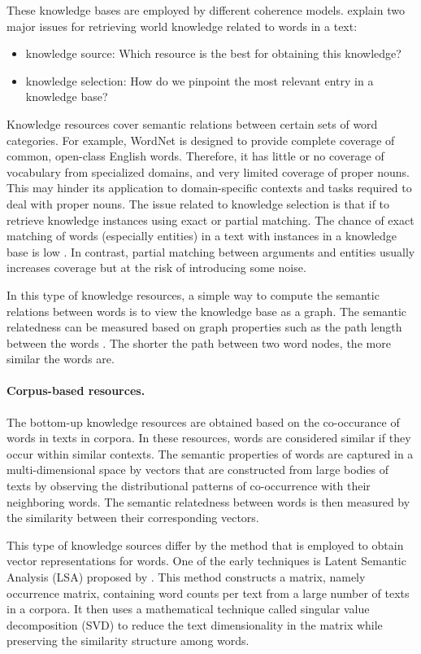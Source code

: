 These knowledge bases are employed by different coherence models.  
 explain two major issues for retrieving world knowledge related to words in a text: 
\begin{itemize}
\item knowledge source: Which resource is the best for obtaining this knowledge? 
\item knowledge selection: How do we pinpoint the most relevant entry in a knowledge base?
\end{itemize}
Knowledge resources cover semantic relations between certain sets of word categories.  
For example, WordNet is designed to provide complete coverage of common, open-class English words. 
Therefore, it has little or no coverage of vocabulary from specialized domains, and very limited coverage of proper nouns. 
This may hinder its application to domain-specific contexts and tasks required to deal with proper nouns. 
The issue related to knowledge selection is that if to retrieve knowledge instances using exact or partial matching. 
The chance of exact matching of words (especially entities) in a text with instances in a knowledge base is low \cite{zhangmuyu15}. 
In contrast, partial matching between arguments and entities usually increases coverage but at the risk of introducing some noise. 

In this type of knowledge resources, a simple way to compute the semantic relations between words is to view the knowledge base as a graph. 
The semantic relatedness can be measured based on graph properties such as the path length between the words \cite{budanitsky06}. 
The shorter the path between two word nodes, the more similar the words are. 

\paragraph{Corpus-based resources.} 
The bottom-up knowledge resources are obtained based on the co-occurance of words in texts in corpora. 
In these resources, words are considered similar if they occur within similar contexts. 
The semantic properties of words are captured in a multi-dimensional space by vectors that are constructed from large bodies of texts by observing the distributional patterns of co-occurrence with their neighboring words. 
The semantic relatedness between words is then measured by the similarity between their corresponding vectors. 

This type of knowledge sources differ by the method that is employed to obtain vector representations for words. 
One of the early techniques is Latent Semantic Analysis (LSA) proposed by . 
This method constructs a matrix, namely occurrence matrix, containing word counts per text from a large number of texts in a corpora.  
It then uses a mathematical technique called singular value decomposition (SVD) \cite{furnas88} to reduce the text dimensionality in the matrix while preserving the similarity structure among words. 

